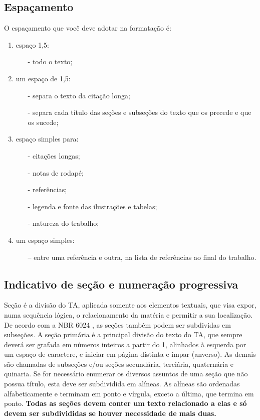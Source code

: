 \subsection{\textbf{Espaçamento}}
O espaçamento que você deve adotar na formatação é:
\begin{enumerate}[label=\alph*)]
\item  espaço 1,5:
\begin{itemize}
\item[-] todo o texto;
\end{itemize}
\item um espaço de 1,5:
\begin{itemize}
\item[-] separa o texto da citação longa;
\item[-] separa cada título das seções e subseções do texto que os precede e que os sucede;
\end{itemize}
\item espaço simples para:
\begin{itemize}
\item[-] citações longas;
\item[-] notas de rodapé;
\item[-] referências;
\item[-] legenda e fonte das ilustrações e tabelas;
\item[-] natureza do trabalho;
\end{itemize}
\item um espaço simples:
\begin{itemize} 
\item[--] entre uma referência e outra, na lista de referências ao final do trabalho.
\end{itemize}
\end{enumerate}



\subsection{\textbf{Indicativo de seção e numeração progressiva}}
Seção é a divisão do TA, aplicada somente aos elementos textuais, que visa expor, numa sequência lógica, o relacionamento da matéria e permitir a sua localização. De acordo com a NBR 6024 \cite{abnt6024}, as seções também podem ser subdividas em subseções.
A seção primária é a principal divisão do texto do TA, que sempre deverá ser grafada em números inteiros a partir do 1, alinhados à esquerda por um espaço de caractere, e iniciar em página distinta e ímpar (anverso). As demais são chamadas de subseções e/ou seções secundária, terciária, quaternária e quinaria. Se for necessário enumerar os diversos assuntos de uma seção que não possua título, esta deve ser subdividida em alíneas. As alíneas são ordenadas alfabeticamente e terminam em ponto e vírgula, exceto a última, que termina em ponto. \textbf{Todas as seções devem conter um texto relacionado a elas e só devem ser subdivididas se houver necessidade de mais duas.}


